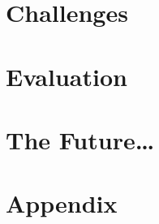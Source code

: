 \documentclass[12pt,a4paper,english,oneside,openright,DIV=12,BCOR=1cm]{scrbook}
\begin{document}
\chapter{Challenges}

\chapter{Evaluation}

\chapter{The Future\ldots}


\clearpage
\def\kapitelautor{}
\appendix

\chapter{Appendix}

\printindex{}



\end{document}
